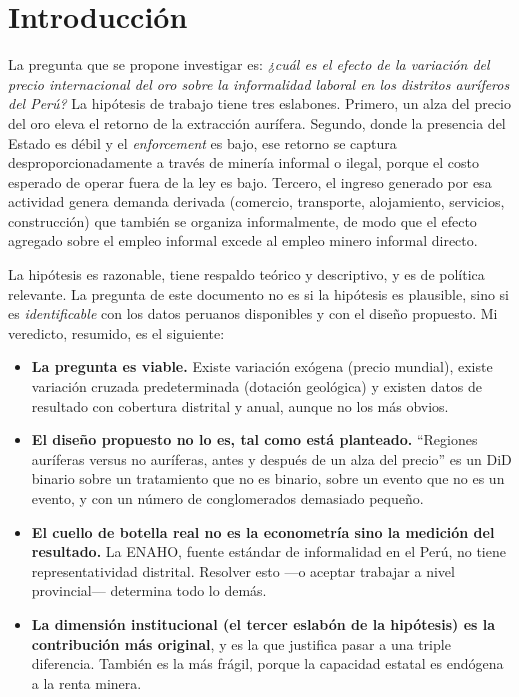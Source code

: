 \documentclass[11pt,a4paper]{article}
\begin{document}
\newpage
\onehalfspacing

\section{Introducción}

La pregunta que se propone investigar es: \emph{¿cuál es el efecto de la variación del precio internacional del oro sobre la informalidad laboral en los distritos auríferos del Perú?} La hipótesis de trabajo tiene tres eslabones. Primero, un alza del precio del oro eleva el retorno de la extracción aurífera. Segundo, donde la presencia del Estado es débil y el \emph{enforcement} es bajo, ese retorno se captura desproporcionadamente a través de minería informal o ilegal, porque el costo esperado de operar fuera de la ley es bajo. Tercero, el ingreso generado por esa actividad genera demanda derivada (comercio, transporte, alojamiento, servicios, construcción) que también se organiza informalmente, de modo que el efecto agregado sobre el empleo informal excede al empleo minero informal directo.

La hipótesis es razonable, tiene respaldo teórico y descriptivo, y es de política relevante. La pregunta de este documento no es si la hipótesis es plausible, sino si es \emph{identificable} con los datos peruanos disponibles y con el diseño propuesto. Mi veredicto, resumido, es el siguiente:

\begin{itemize}[leftmargin=1.6em,itemsep=2pt]
\item \textbf{La pregunta es viable.} Existe variación exógena (precio mundial), existe variación cruzada predeterminada (dotación geológica) y existen datos de resultado con cobertura distrital y anual, aunque no los más obvios.
\item \textbf{El diseño propuesto no lo es, tal como está planteado.} ``Regiones auríferas versus no auríferas, antes y después de un alza del precio'' es un DiD binario sobre un tratamiento que no es binario, sobre un evento que no es un evento, y con un número de conglomerados demasiado pequeño.
\item \textbf{El cuello de botella real no es la econometría sino la medición del resultado.} La ENAHO, fuente estándar de informalidad en el Perú, no tiene representatividad distrital. Resolver esto ---o aceptar trabajar a nivel provincial--- determina todo lo demás.
\item \textbf{La dimensión institucional (el tercer eslabón de la hipótesis) es la contribución más original}, y es la que justifica pasar a una triple diferencia. También es la más frágil, porque la capacidad estatal es endógena a la renta minera.
\end{itemize}
\end{document}
